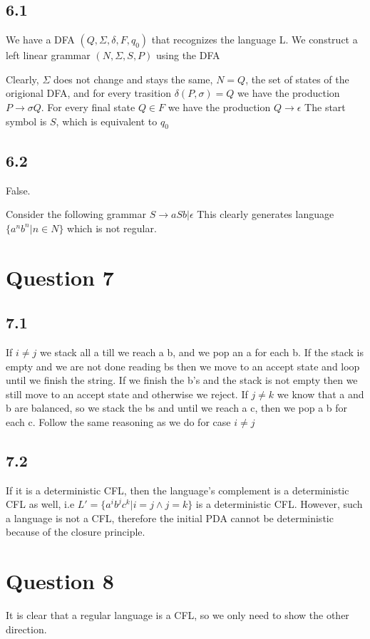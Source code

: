 \documentclass[a4paper, 11pt]{article}
\begin{document}
\subsection*{6.1}
We have a DFA $(Q,\Sigma, \delta, F, q_0)$ that recognizes the language L. 
We construct a left linear grammar $(N,\Sigma,S,P)$ using the DFA

Clearly, $\Sigma$ does not change and stays the same, $N=Q$, the set of states of the origional DFA, 
and for every trasition $\delta(P,\sigma) = Q$ we have the production $P \rightarrow \sigma Q$.
For every final state $Q \in F$ we have the production $Q \rightarrow \epsilon$
The start symbol is $S$, which is equivalent to $q_0$

\subsection*{6.2}
False.

Consider the following grammar $ S \rightarrow aSb|  \epsilon$
This clearly generates language $\{a^nb^n | n \in N\}$ which is not regular.

\section*{Question 7}
\subsection*{7.1}
If $i\neq j$ we stack all a till we reach a b, and we pop an a for each b.
If the stack is empty and we are not done reading bs then we move to an accept state and loop until we finish the string.
If we finish the b's and the stack is not empty then we still move to an accept state and otherwise we reject.
If $j \neq k$ we know that a and b are balanced, so we stack the bs and until we reach a c, then we pop a b for each c. Follow the same reasoning as we do for case $i \neq j$

\subsection*{7.2}
If it is a deterministic CFL, then the language's complement is a deterministic CFL as well, 
i.e $L'=\{a^ib^jc^k|i = j \land j = k\}$ is a deterministic CFL. 
However, such a language is not a CFL, therefore the initial PDA cannot be deterministic because of the closure principle.


\section*{Question 8}
It is clear that a regular language is a CFL, so we only need to show the other direction.
\end{document}
